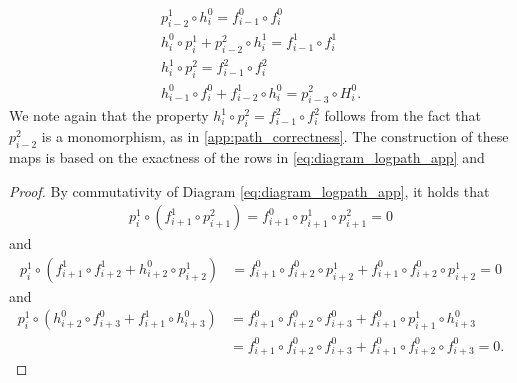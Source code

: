 \begin{equation} \label{eq:map_properties}
\begin{aligned}
p_{i-2}^1\circ h^0_i=f^0_{i-1}\circ f^0_{i} \\
h^0_i\circ p^1_i + p^2_{i-2}\circ h^1_i = f^1_{i-1}\circ f^1_i \\ 
h^1_i\circ p_i^2=f^2_{i-1}\circ f^2_{i} \\
h^0_{i-1} \circ f^0_i + f^1_{i-2}\circ h^0_{i} =p^2_{i-3}\circ H_i^0 .
\end{aligned}
\end{equation}
We note again that the property $h^1_i\circ p_i^2=f^2_{i-1}\circ f^2_{i}$ follows from the fact that $p_{i-2}^2$ is a monomorphism, as in \ref{app:path_correctness}. The construction of these maps is based on the exactness of the rows in \eqref{eq:diagram_logpath_app} and
%
%
\begin{proof}%
    By commutativity of Diagram \ref{eq:diagram_logpath_app}, it holds that
    \begin{equation*}
     \begin{split}
          p^1_i\circ (f^1_{i+1}\circ p^2_{i+1})=f_{i+1}^0\circ p_{i+1}^1\circ p_{i+1}^2=0 
     \end{split}
    \end{equation*}
    and
    \begin{equation*}
     \begin{split}
            p^1_{i}\circ (f^1_{i+1}\circ f^1_{i+2} + h^0_{i+2}\circ p^1_{i+2}) & = f^0_{i+1}\circ f^0_{i+2} \circ p^1_{i+2} + f_{i+1}^0\circ f_{i+2}^0 \circ p^1_{i+2} = 0
    \end{split}
    \end{equation*}
    and
    \begin{equation*}
    \begin{split}
    p^1_{i}\circ(h^0_{i+2}\circ f^0_{i+3} + f^1_{i+1} \circ h^0_{i+3}) &= f_{i+1}^0\circ f_{i+2}^0\circ f_{i+3}^0+f_{i+1}^0\circ p_{i+1}^1\circ h_{i+3}^0 \\ & = f_{i+1}^0\circ f_{i+2}^0\circ f_{i+3}^0+f_{i+1}^0\circ f_{i+2}^0\circ f_{i+3}^0=0 .
    \end{split}
    \end{equation*}
\end{proof}
%
